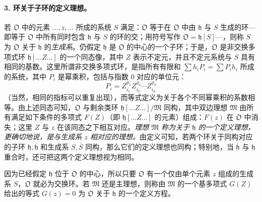 \paragraph{3. 环关于子环的定义理想。}
若 \(\mathfrak O\) 中的元素 \(\ldots,z,\ldots\) 所成的系统 \(S\) 满足：\(\mathfrak O\) 等于在 \(\mathfrak O\) 中由 \(\mathfrak h\) 与 \(S\) 生成的环---即等于 \(\mathfrak O\) 中所有同时包含 \(\mathfrak h\) 与 \(S\) 的环的交；用符号写作 \(\mathfrak O=\mathfrak h[S]\)---，则称 \(S\) 为 \(\mathfrak O\) 关于 \(\mathfrak h\) 的\emph{生成系}。仍假定 \(\mathfrak h\) 是 \(\mathfrak O\) 的中心的一个子环；于是，\(\mathfrak O\) 是非交换多项式环 \(\mathfrak h[\ldots Z\ldots]\) 的一个同态像，其中 \(Z\) 表示不定元，并且不定元系统与 \(S\) 具有相同的基数。这里所谓非交换多项式环，是指所有有限和 \(\sum h_iP_i=\sum P_i h_i\) 所成的系统，其中 \(P_i\) 是幂乘积，包括与指数 \(0\) 对应的单位元：
\[
P_i=Z_{i_1}^{\varrho_1}Z_{i_2}^{\varrho_2}\cdots Z_{i_n}^{\varrho_n}
\]
（当然，相同的指标可以重复出现），而等式定义为关于各个不同幂乘积的系数相等。由上述同态可知，\(\mathfrak O\) 与剩余类环 \(\mathfrak h[\ldots Z\ldots]/\mathfrak M\) 同构，其中双边理想 \(\mathfrak M\) 由所有满足如下条件的多项式 \(F(Z)\)（即 \(\mathfrak h[\ldots Z\ldots]\) 的元素）组成：\(F(z)\) 在 \(\mathfrak O\) 中消失；这里 \(Z\) 与 \(z\) 在该同态之下相互对应。\emph{理想 \(\mathfrak M\) 称为关于 \(\mathfrak h\) 的一个定义理想，更确切地说，是与生成系 \(z\) 相对应的理想。}由定义可知，若两个环关于同构对应的子环 \(\mathfrak h,\overline{\mathfrak h}\) 和生成系 \(S,\overline S\) 同构，那么它们的定义理想也同构；特别地，当 \(\overline{\mathfrak h}\) 与 \(\mathfrak h\) 重合时，还可把这两个定义理想视为相同。

因为已经假定 \(\mathfrak h\) 位于 \(\mathfrak O\) 的中心，所以只要 \(\mathfrak O\) 有一个仅由单个元素 \(z\) 组成的生成系 \(S\)，\(\mathfrak O\) 就必为交换环。若 \(\mathfrak M\) 还是主理想，则称由 \(\mathfrak M\) 的一个基多项式 \(G(Z)\) 给出的等式 \(G(z)=0\) 为 \(\mathfrak O\) 关于 \(\mathfrak h\) 的一个定义方程。

